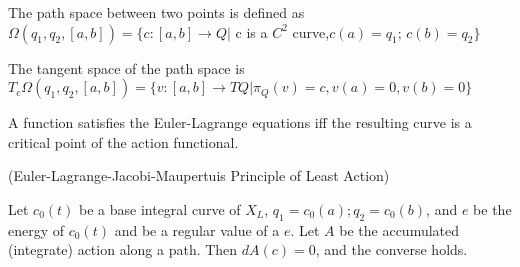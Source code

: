 \documentclass{article}
\begin{document}
\begin{defn}

The path space between two points is defined as $ \Omega(q_1, q_2, [a,b]) = \{c: [a,b] \to Q \vert $ c is a $C^2$ curve,$ c(a)=q_1; \hspace{2pt} c(b) = q_2 \} $

\end{defn}

\begin{prop}

The tangent space of the path space is $ T_c \Omega(q_1, q_2, [a,b]) = \{v:[a,b] \to TQ \vert \pi_Q(v)=c, v(a) = 0, v(b)=0 \}$

\end{prop}

\begin{thm}

A function satisfies the Euler-Lagrange equations iff the resulting curve is a critical point of the action functional.

\end{thm}

\begin{thm}{(Euler-Lagrange-Jacobi-Maupertuis Principle of Least Action)}

Let $c_0(t)$ be a base integral curve of $X_L$, $q_1 = c_0(a); q_2 = c_0(b)$, and $e$ be the energy of $c_0(t)$ and be a regular value of a $e$. Let $A$ be the accumulated (integrate) action along a path. Then $dA(c)=0$, and the converse holds.

\end{thm}
\end{document}
